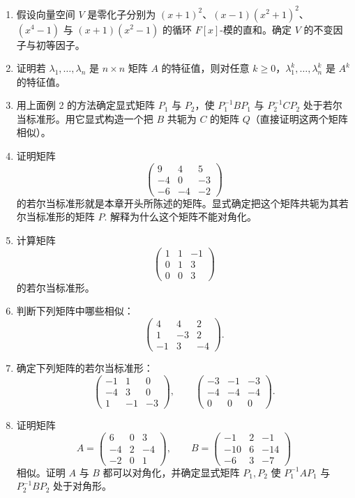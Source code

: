 \begin{enumerate}
\item 假设向量空间 \(V\) 是零化子分别为 \((x+1)^2\)、\((x-1)(x^2+1)^2\)、\((x^4-1)\) 与 \((x+1)(x^2-1)\) 的循环 \(F[x]\)-模的直和。确定 \(V\) 的不变因子与初等因子。

\item 证明若 \(\lambda_1, \ldots, \lambda_n\) 是 \(n \times n\) 矩阵 \(A\) 的特征值，则对任意 \(k \geq 0\)，\(\lambda_1^k, \ldots, \lambda_n^k\) 是 \(A^k\) 的特征值。

\item 用上面例 2 的方法确定显式矩阵 \(P_1\) 与 \(P_2\)，使 \(P_1^{-1}BP_1\) 与 \(P_2^{-1}CP_2\) 处于若尔当标准形。用它显式构造一个把 \(B\) 共轭为 \(C\) 的矩阵 \(Q\)（直接证明这两个矩阵相似）。

\item 证明矩阵
\[
\begin{pmatrix} 9 & 4 & 5 \\ -4 & 0 & -3 \\ -6 & -4 & -2 \end{pmatrix}
\]
的若尔当标准形就是本章开头所陈述的矩阵。显式确定把这个矩阵共轭为其若尔当标准形的矩阵 \(P\). 解释为什么这个矩阵不能对角化。

\item 计算矩阵
\[
\begin{pmatrix} 1 & 1 & -1 \\ 0 & 1 & 3 \\ 0 & 0 & 3 \end{pmatrix}
\]
的若尔当标准形。

\item 判断下列矩阵中哪些相似：
\[
\begin{pmatrix} 4 & 4 & 2 \\ 1 & -3 & 2 \\ -1 & 3 & -4 \end{pmatrix}.
\]

\item 确定下列矩阵的若尔当标准形：
\[
\begin{pmatrix} -1 & 1 & 0 \\ -4 & 3 & 0 \\ 1 & -1 & -3 \end{pmatrix}, \qquad \begin{pmatrix} -3 & -1 & -3 \\ -4 & -4 & -4 \\ 0 & 0 & 0 \end{pmatrix}.
\]

\item 证明矩阵
\[
A = \begin{pmatrix} 6 & 0 & 3 \\ -4 & 2 & -4 \\ -2 & 0 & 1 \end{pmatrix}, \qquad B = \begin{pmatrix} -1 & 2 & -1 \\ -10 & 6 & -14 \\ -6 & 3 & -7 \end{pmatrix}
\]
相似。证明 \(A\) 与 \(B\) 都可以对角化，并确定显式矩阵 \(P_1, P_2\) 使 \(P_1^{-1}AP_1\) 与 \(P_2^{-1}BP_2\) 处于对角形。


\end{enumerate}
